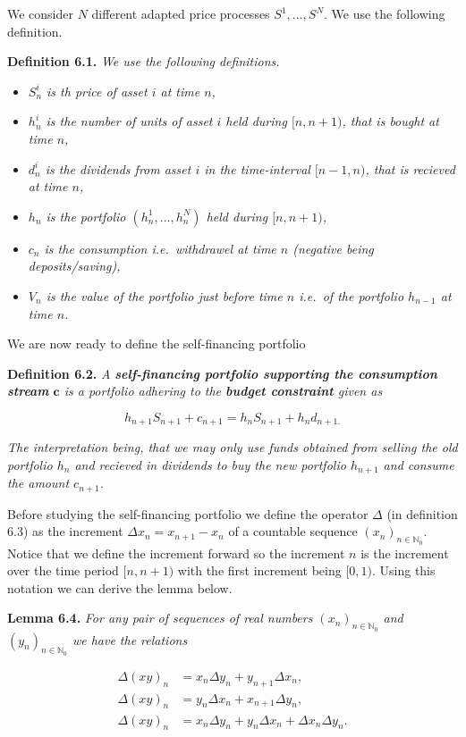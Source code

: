 \documentclass[
]{article}
\providecommand{\tightlist}{%
  \setlength{\itemsep}{0pt}\setlength{\parskip}{0pt}}
\begin{document}
We consider \(N\) different adapted price processes \(S^1,...,S^N\). We
use the following definition.

\textbf{Definition 6.1.} \emph{We use the following definitions.}

\begin{itemize}
\tightlist
\item
  \emph{\(S_n^i\) is th price of asset \(i\) at time \(n\),}
\item
  \emph{\(h_n^i\) is the number of units of asset \(i\) held during
  \([n,n+1)\), that is bought at time \(n\),}
\item
  \emph{\(d_n^i\) is the dividends from asset \(i\) in the time-interval
  \([n-1,n)\), that is recieved at time \(n\),}
\item
  \emph{\(h_n\) is the portfolio \((h_n^1,...,h_n^N)\) held during
  \([n,n+1)\),}
\item
  \emph{\(c_n\) is the consumption i.e.~withdrawel at time \(n\)
  (negative being deposits/saving),}
\item
  \emph{\(V_n\) is the value of the portfolio just before time \(n\)
  i.e.~of the portfolio \(h_{n-1}\) at time \(n\).}
\end{itemize}

We are now ready to define the self-financing portfolio

\textbf{Definition 6.2.} \emph{A \textbf{self-financing portfolio
supporting the consumption stream} \(\mathbf{c}\) is a portfolio
adhering to the \textbf{budget constraint} given as}

\[
h_{n+1}S_{n+1}+c_{n+1}=h_nS_{n+1}+h_nd_{n+1.}
\]

\emph{The interpretation being, that we may only use funds obtained from
selling the old portfolio \(h_n\) and recieved in dividends to buy the
new portfolio \(h_{n+1}\) and consume the amount \(c_{n+1}\).}

Before studying the self-financing portfolio we define the operator
\(\Delta\) (in definition 6.3) as the increment
\(\Delta x_n=x_{n+1}-x_n\) of a countable sequence
\((x_n)_{n\in\mathbb{N}_0}\). Notice that we define the increment
forward so the increment \(n\) is the increment over the time period
\([n,n+1)\) with the first increment being \([0,1)\). Using this
notation we can derive the lemma below.

\textbf{Lemma 6.4.} \emph{For any pair of sequences of real numbers
\((x_n)_{n\in\mathbb{N}_0}\) and \((y_n)_{n\in\mathbb{N}_0}\) we have
the relations}

\begin{align*}
\Delta(xy)_n&=x_n\Delta y_n+y_{n+1}\Delta x_n,\tag{6.5}\\
\Delta(xy)_n&=y_n\Delta x_n+x_{n+1}\Delta y_n,\tag{6.6}\\
\Delta(xy)_n&=x_n\Delta y_n+y_n\Delta x_n+\Delta x_n\Delta y_n.\tag{6.7}
\end{align*}
\end{document}
